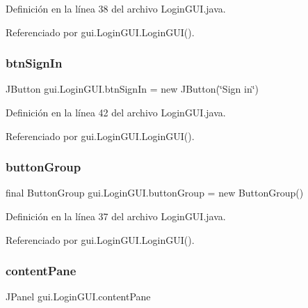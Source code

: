 Definición en la línea 38 del archivo Login\+G\+U\+I.\+java.



Referenciado por gui.\+Login\+G\+U\+I.\+Login\+G\+U\+I().

\mbox{\label{classgui_1_1_login_g_u_i_a7e8b654313ae594bb8b02f128e2236a3}} 
\subsubsection{\texorpdfstring{btnSignIn}{btnSignIn}}
{\footnotesize\ttfamily J\+Button gui.\+Login\+G\+U\+I.\+btn\+Sign\+In = new J\+Button(\char`\"{}Sign in\char`\"{})\hspace{0.3cm}{\ttfamily [private]}}



Definición en la línea 42 del archivo Login\+G\+U\+I.\+java.



Referenciado por gui.\+Login\+G\+U\+I.\+Login\+G\+U\+I().

\mbox{\label{classgui_1_1_login_g_u_i_a61f34a13877bb80cedba5da01646e587}} 
\subsubsection{\texorpdfstring{buttonGroup}{buttonGroup}}
{\footnotesize\ttfamily final Button\+Group gui.\+Login\+G\+U\+I.\+button\+Group = new Button\+Group()\hspace{0.3cm}{\ttfamily [private]}}



Definición en la línea 37 del archivo Login\+G\+U\+I.\+java.



Referenciado por gui.\+Login\+G\+U\+I.\+Login\+G\+U\+I().

\mbox{\label{classgui_1_1_login_g_u_i_aa1c9213d05aa2cf70dacbec422774f06}} 
\subsubsection{\texorpdfstring{contentPane}{contentPane}}
{\footnotesize\ttfamily J\+Panel gui.\+Login\+G\+U\+I.\+content\+Pane\hspace{0.3cm}{\ttfamily [private]}}



